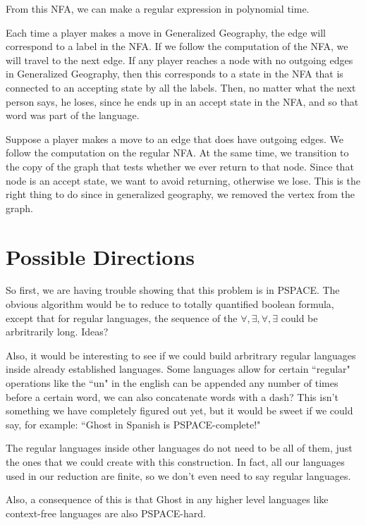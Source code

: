 \documentclass[11pt]{article}
\begin{document}
From this NFA, we can make a regular expression in polynomial time.

Each time a player makes a move in Generalized Geography, the edge will correspond to a label in the NFA. If we follow the computation of the NFA, we will travel to the next edge. If any player reaches a node with no outgoing edges in Generalized Geography, then this corresponds to a state in the NFA that is connected to an accepting state by all the labels. Then, no matter what the next person says, he loses, since he ends up in an accept state in the NFA, and so that word was part of the language.

Suppose a player makes a move to an edge that does have outgoing edges. We follow the computation on the regular NFA. At the same time, we transition to the copy of the graph that tests whether we ever return to that node. Since that node is an accept state, we want to avoid returning, otherwise we lose. This is the right thing to do since in generalized geography, we removed the vertex from the graph. 

\section{Possible Directions}

So first, we are having trouble showing that this problem is in PSPACE. The obvious algorithm would be to reduce to totally quantified boolean formula, except that for regular languages, the sequence of the $\forall , \exists, \forall, \exists$ could be arbritrarily long. Ideas?

Also, it would be interesting to see if we could build arbritrary regular languages inside already established languages. Some languages allow for certain ``regular" operations like the ``un" in the english can be appended any number of times before a certain word, we can also concatenate words with a dash? This isn't something we have completely figured out yet, but it would be sweet if we could say, for example: ``Ghost in Spanish is PSPACE-complete!"

The regular languages inside other languages do not need to be all of them, just the ones that we could create with this construction. In fact, all our languages used in our reduction are finite, so we don't even need to say regular languages.

Also, a consequence of this is that Ghost in any higher level languages like context-free languages are also PSPACE-hard.
\end{document}
